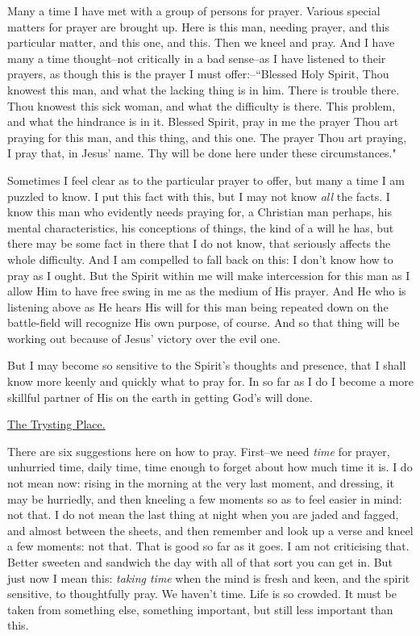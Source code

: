 Many a time I have met with a group of persons for prayer. Various special
matters for prayer are brought up. Here is this man, needing prayer, and
this particular matter, and this one, and this. Then we kneel and pray.
And I have many a time thought--not critically in a bad sense--as I have
listened to their prayers, as though this is the prayer I must
offer:--``Blessed Holy Spirit, Thou knowest this man, and what the lacking
thing is in him. There is trouble there. Thou knowest this sick woman, and
what the difficulty is there. This problem, and what the hindrance is in
it. Blessed Spirit, pray in me the prayer Thou art praying for this man,
and this thing, and this one. The prayer Thou art praying, I pray that, in
Jesus' name. Thy will be done here under these circumstances."

Sometimes I feel clear as to the particular prayer to offer, but many a
time I am puzzled to know. I put this fact with this, but I may not know
\textit{all} the facts. I know this man who evidently needs praying for, a
Christian man perhaps, his mental characteristics, his conceptions of
things, the kind of a will he has, but there may be some fact in there
that I do not know, that seriously affects the whole difficulty. And I am
compelled to fall back on this: I don't know how to pray as I ought. But
the Spirit within me will make intercession for this man as I allow Him to
have free swing in me as the medium of His prayer. And He who is listening
above as He hears His will for this man being repeated down on the
battle-field will recognize His own purpose, of course. And so that thing
will be working out because of Jesus' victory over the evil one.

But I may become so sensitive to the Spirit's thoughts and presence, that
I shall know more keenly and quickly what to pray for. In so far as I do
I become a more skillful partner of His on the earth in getting God's will
done.



\underline{The Trysting Place.}


There are six suggestions here on how to pray. First--we need \textit{time} for
prayer, unhurried time, daily time, time enough to forget about how much
time it is. I do not mean now: rising in the morning at the very last
moment, and dressing, it may be hurriedly, and then kneeling a few moments
so as to feel easier in mind: not that. I do not mean the last thing at
night when you are jaded and fagged, and almost between the sheets, and
then remember and look up a verse and kneel a few moments: not that. That
is good so far as it goes. I am not criticising that. Better sweeten and
sandwich the day with all of that sort you can get in. But just now I mean
this: \textit{taking time} when the mind is fresh and keen, and the spirit
sensitive, to thoughtfully pray. We haven't time. Life is so crowded. It
must be taken from something else, something important, but still less
important than this.

